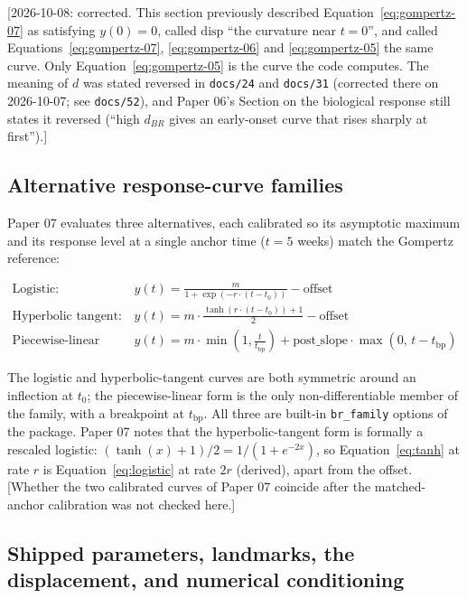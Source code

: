 \documentclass[11pt]{article}
\newcommand{\note}[1]{\textcolor{blue!60!black}{\small [#1]}}
\newcommand{\code}[1]{\texttt{#1}}
\begin{document}
\note{2026-10-08: corrected. This section previously described
Equation~\eqref{eq:gompertz-07} as satisfying $y(0) = 0$, called
$\mathrm{disp}$ ``the curvature near $t=0$'', and called
Equations~\eqref{eq:gompertz-07}, \eqref{eq:gompertz-06} and
\eqref{eq:gompertz-05} the same curve. Only
Equation~\eqref{eq:gompertz-05} is the curve the code computes. The
meaning of $d$ was stated reversed in \code{docs/24} and
\code{docs/31} (corrected there on 2026-10-07; see \code{docs/52}),
and Paper 06's Section on the biological response still states it
reversed (``high $d_{BR}$ gives an early-onset curve that rises
sharply at first'').}

\subsection{Alternative response-curve families}

Paper 07 evaluates three alternatives, each calibrated so its
asymptotic maximum and its response level at a single anchor time
($t=5$ weeks) match the Gompertz reference:

\begin{align}
\text{Logistic:} \qquad & y(t) = \frac{m}{1 +
  \exp(-r\cdot(t - t_0))} - \mathrm{offset}
  \label{eq:logistic} \\
\text{Hyperbolic tangent:} \qquad & y(t) = m\cdot
  \frac{\tanh(r\cdot(t-t_0)) + 1}{2} - \mathrm{offset}
  \label{eq:tanh} \\
\text{Piecewise-linear breakpoint:} \qquad & y(t) = m\cdot
  \min\!\left(1, \frac{t}{t_{\mathrm{bp}}}\right) +
  \mathrm{post\_slope}\cdot\max(0,\, t - t_{\mathrm{bp}})
  \label{eq:plb}
\end{align}

The logistic and hyperbolic-tangent curves are both symmetric around
an inflection at $t_0$; the piecewise-linear form is the only
non-differentiable member of the family, with a breakpoint at
$t_{\mathrm{bp}}$. All three are built-in \code{br\_family} options
of the package. Paper 07 notes that the hyperbolic-tangent form is
formally a rescaled logistic: $(\tanh(x) + 1)/2 = 1/(1 + e^{-2x})$, so
Equation~\eqref{eq:tanh} at rate $r$ is Equation~\eqref{eq:logistic}
at rate $2r$ (derived), apart from the offset. \note{Whether the two
calibrated curves of Paper 07 coincide after the matched-anchor
calibration was not checked here.}

\subsection{Shipped parameters, landmarks, the displacement, and
numerical conditioning}
\label{sec:invc-gomp-landmarks}
\end{document}
